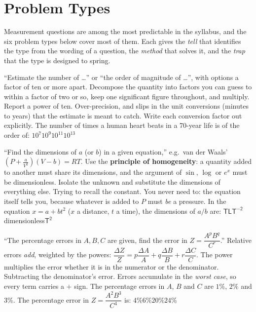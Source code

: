 \section{Problem Types}\label{sec:types1}
Measurement questions are among the most predictable in the syllabus, and the six problem types below
cover most of them. Each gives the \emph{tell} that identifies the type from the wording of a
question, the \emph{method} that solves it, and the \emph{trap} that the type is designed to spring.

{``Estimate the number of \ldots'' or ``the order of magnitude of \ldots'', with options a factor of ten
or more apart.}
{Decompose the quantity into factors you can guess to within a factor of two or so, keep one significant
figure throughout, and multiply. Report a power of ten.}
{Over-precision, and slips in the unit conversions (minutes to years) that the estimate is meant to
catch. Write each conversion factor out explicitly.}
{The number of times a human heart beats in a 70-year life is of the order of:}
{$10^{7}$}{$10^{9}$}{$10^{11}$}{$10^{13}$}

{``Find the dimensions of $a$ (or $b$) in a given equation,'' e.g.\ van der Waals' $\left(P+\frac{a}{V^2}\right)(V-b)=RT$.}
{Use the \textbf{principle of homogeneity}: a quantity added to another must share its dimensions, and
the argument of $\sin$, $\log$ or $e^x$ must be dimensionless. Isolate the unknown and substitute the
dimensions of everything else.}
{Trying to recall the constant. You never need to: the equation itself tells you, because whatever is
added to $P$ must \emph{be} a pressure.}
{In the equation $x=a+bt^2$ ($x$ a distance, $t$ a time), the dimensions of $a/b$ are:}
{$\mathsf{T}$}{$\mathsf{L T^{-2}}$}{dimensionless}{$\mathsf{T^2}$}

{``The percentage errors in $A,B,C$ are given, find the error in $Z=\dfrac{A^pB^q}{C^r}$.''}
{Relative errors \emph{add}, weighted by the powers:
$\dfrac{\Delta Z}{Z}=p\dfrac{\Delta A}{A}+q\dfrac{\Delta B}{B}+r\dfrac{\Delta C}{C}$. The power multiplies
the error whether it is in the numerator or the denominator.}
{Subtracting the denominator's error. Errors accumulate in the \emph{worst case}, so every term carries a
$+$ sign.}
{The percentage errors in $A$, $B$ and $C$ are $1\%$, $2\%$ and $3\%$. The percentage error in
$Z=\dfrac{A^2B^3}{C^4}$ is:}
{$4\%$}{$6\%$}{$20\%$}{$24\%$}

